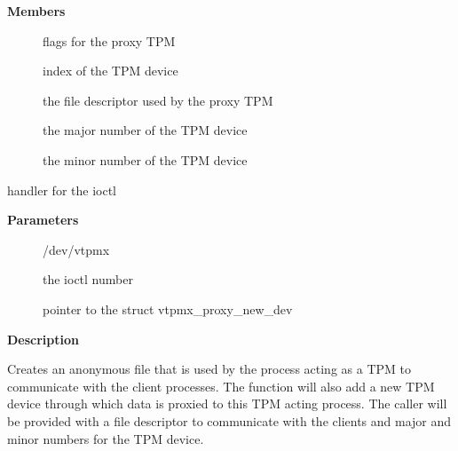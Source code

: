 \documentclass[a4paper,8pt,english]{sphinxmanual}
\begin{document}
\textbf{Members}
\begin{description}
\item[{}] \leavevmode
flags for the proxy TPM

\item[{}] \leavevmode
index of the TPM device

\item[{}] \leavevmode
the file descriptor used by the proxy TPM

\item[{}] \leavevmode
the major number of the TPM device

\item[{}] \leavevmode
the minor number of the TPM device

\end{description}

\begin{fulllineitems}
\label{security/tpm/tpm_vtpm_proxy:c.vtpmx_ioc_new_dev}
handler for the  ioctl

\end{fulllineitems}


\textbf{Parameters}
\begin{description}
\item[{}] \leavevmode
/dev/vtpmx

\item[{}] \leavevmode
the ioctl number

\item[{}] \leavevmode
pointer to the struct vtpmx\_proxy\_new\_dev

\end{description}

\textbf{Description}

Creates an anonymous file that is used by the process acting as a TPM to
communicate with the client processes. The function will also add a new TPM
device through which data is proxied to this TPM acting process. The caller
will be provided with a file descriptor to communicate with the clients and
major and minor numbers for the TPM device.



\renewcommand{\indexname}{Index}
\printindex
\end{document}
